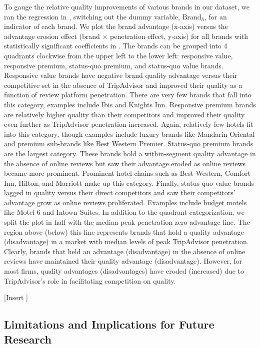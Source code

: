 \documentclass[12pt, leqno]{article}
\begin{document}
To gauge the relative quality improvements of various brands in our dataset, we ran the regression in , switching out the dummy variable, $\text{Brand}_h$, for an indicator of each brand. We plot the brand advantage (x-axis) versus the advantage erosion effect (brand $\times$ penetration effect, y-axis) for all brands with statistically significant coefficients in .  The brands can be grouped into 4 quadrants clockwise from the upper left to the lower left: responsive value, responsive premium, status-quo premium, and status-quo value brands. Responsive value brands have negative brand quality advantage versus their competitive set in the absence of TripAdvisor and improved their quality as a function of review platform penetration. There are very few brands that fall into this category, examples include Ibis and Knights Inn. Responsive premium brands are relatively higher quality than their competitors and improved their quality even further as TripAdvisor penetration increased. Again, relatively few hotels fit into this category, though examples include luxury brands like Mandarin Oriental and premium sub-brands like Best Western Premier. Status-quo premium brands are the largest category. These brands hold a within-segment quality advantage in the absence of online reviews but saw their advantage eroded as online reviews became more prominent. Prominent hotel chains such as Best Western, Comfort Inn, Hilton, and Marriott make up this category. Finally, status-quo value brands lagged in quality versus their direct competitors and saw their competitors' advantage grow as online reviews proliferated. Examples include budget motels like Motel 6 and Intown Suites. In addition to the quadrant categorization, we split the plot in half with the median peak penetration zero-advantage line. The region above (below) this line represents brands that hold a quality advantage (disadvantage) in a market with median levels of peak TripAdvisor penetration. Clearly, brands that held an advantage (disadvantage) in the absence of online reviews have maintained their quality advantage (disadvantage). However, for most firms, quality advantages (disadvantages) have eroded (increased) due to TripAdvisor's role in facilitating competition on quality. 

[Insert ]

\subsection{Limitations and Implications for Future Research}
\end{document}

